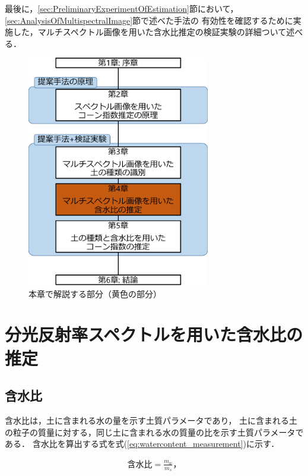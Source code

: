 最後に，\ref{sec:PreliminaryExperimentOfEstimation}節において，
\ref{sec:AnalysisOfMultispectralImage}節で述べた手法の
有効性を確認するために実施した，マルチスペクトル画像を用いた含水比推定の検証実験の詳細ついて述べる．%

\begin{figure}[p]
	\begin{center}
	\centering
	\includegraphics[width=8cm]{./Ch4_WaterContentEstimation/Fig/thesis_constitution_ch4_compressed.pdf}
	\caption{本章で解説する部分（黄色の部分）}\label{fig:thesis_constitution_ch4}
	\end{center}
\end{figure}

\clearpage


\section{分光反射率スペクトルを用いた含水比の推定}
\label{sec:EstimationFromSpectrum}

\subsection{含水比}
\label{ssec:WaterContent}

含水比は，土に含まれる水の量を示す土質パラメータであり，
土に含まれる土の粒子の質量に対する，同じ土に含まれる水の質量の比を示す土質パラメータである．
含水比を算出する式を\mbox{式(\ref{eq:watercontent_measurement})}に示す\cite{日本建設総合試験所2019}．

\begin{eqnarray}
含水比 = \frac{m_w}{m_s}， \label{eq:watercontent_measurement}
\end{eqnarray}

